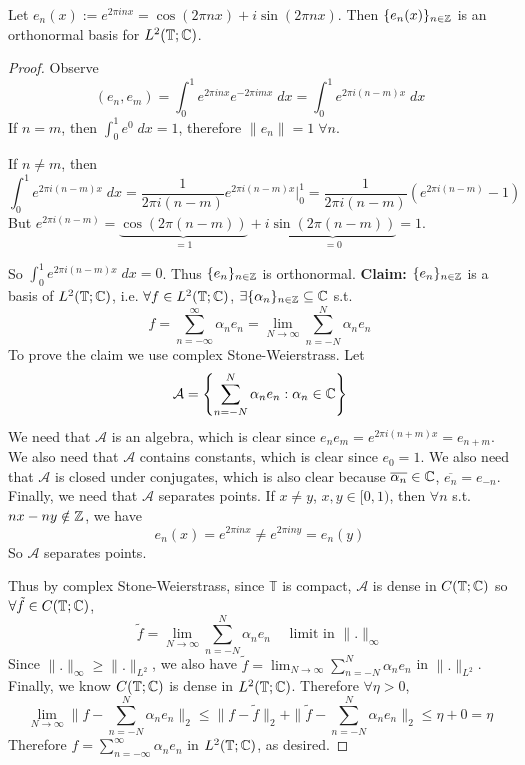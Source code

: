 \begin{thm}
    Let $e_n(x) := e^{2 \pi i n x} = \cos(2 \pi n x) + i \sin(2 \pi n x)$. Then
    $\{e_{n}(x)\}_{n \in \mathbb{Z}}$ is an orthonormal basis for $L^2(\mathbb{T}; \mathbb{C})$. 
\end{thm}
\begin{proof}
    Observe 
    \[
        (e_n, e_m) = \int_0^1 e^{2 \pi i n x} e^{-2 \pi i m x} \; dx = \int_0^1 e^{2 \pi i (n - m) x} \; dx
    \] 
    If $n = m$, then $\int_0^1 e^0 \; dx  = 1$, therefore $\| e_n \| = 1 \; \forall n$.

    If $n \neq m$, then 
    \[
    \int_0^1 e^{2 \pi i (n - m) x} \; dx  = \frac{1}{2 \pi i (n - m)} e^{2 \pi i (n - m)x} \Big|_0^1 = \frac{1}{2 \pi i (n - m)} (e^{2 \pi i (n - m)} - 1)
    \]
    But $e^{2 \pi i (n - m)} = \underbrace{\cos(2 \pi (n - m))}_{= 1} + i \underbrace{\sin(2 \pi (n - m))}_{= 0} = 1$.
    
    So $\int_0^1 e^{2 \pi i (n - m) x} \; dx = 0$. Thus $\{e_n\}_{n \in \mathbb{Z}}$ is orthonormal.
    \newline \textbf{Claim:} $\{e_n\}_{n \in \mathbb{Z}}$ is a basis of $L^2(\mathbb{T}; \mathbb{C})$, i.e. 
    $\forall f \in L^2(\mathbb{T}; \mathbb{C})$, $\exists \{\alpha_n \}_{n \in \mathbb{Z}} \subseteq \mathbb{C}$ s.t.
    \[
        f = \sum_{n=-\infty}^\infty \alpha_n e_n = \lim_{N \to \infty} \sum_{n=-N}^N \alpha_n e_n
    \]   
    To prove the claim we use complex Stone-Weierstrass. Let
    \[
        \mathcal{A} = \left\{ \sum_{n = -N}^N \alpha_n e_n : \alpha_n \in \mathbb{C} \right\} 
    \] 
    We need that $\mathcal{A}$ is an algebra, which is clear since $e_n e_m = e^{2 \pi i (n + m) x} = e_{n+m}$.
    We also need that $\mathcal{A}$ contains constants, which is clear since $e_0 = 1$. We also
    need that $\mathcal{A}$ is closed under conjugates, which is also clear because $\overline{\alpha_n} \in \mathbb{C}$,
    $\overline{e_n} = e_{-n}$. Finally, we need that $\mathcal{A}$ separates points. 
    If $x \neq y$, $x, y \in [0, 1)$, then $\forall n$ s.t. $nx - ny \notin \mathbb{Z}$, we have
    \[
        e_n(x) = e^{2 \pi i n x} \neq e^{2 \pi i n y} = e_n(y)
    \]
    So $\mathcal{A}$ separates points. 
    
    Thus by complex Stone-Weierstrass, since $\mathbb{T}$ is compact, $\mathcal{A}$ is dense in $C(\mathbb{T}; \mathbb{C})$
    so $\forall \tilde{f} \in C(\mathbb{T}; \mathbb{C})$, 
    \[
        \tilde{f} = \lim_{N \to \infty} \sum_{n=-N}^N \alpha_n e_n \quad \text{ limit in }  \| . \|_\infty
    \] 
    Since $\| . \|_\infty \geq \| . \|_{L^2}$, we also have $\tilde{f} = \lim_{N \to \infty} \sum_{n=-N}^N \alpha_n e_n$ in $\| . \|_{L^2}$.
    Finally, we know $C(\mathbb{T}; \mathbb{C})$ is dense in $L^2(\mathbb{T}; \mathbb{C})$.
    Therefore $\forall \eta > 0$,
    \[
        \lim_{N \to \infty} \| f - \sum_{n = -N}^N \alpha_n e_n \|_{2} \leq \| f - \tilde{f} \|_2 + 
        \| \tilde{f} - \sum_{n = -N}^N \alpha_n e_n \|_2 \leq \eta + 0 = \eta  
    \]  
    Therefore $f = \sum_{n = -\infty}^\infty \alpha_n e_n$ in $L^2(\mathbb{T}; \mathbb{C})$, as desired. \qedhere 

\end{proof}

